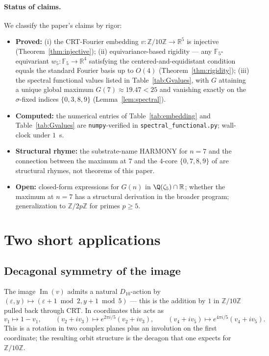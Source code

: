 \documentclass[11pt,reqno]{amsart}
\theoremstyle{definition}
\newcommand{\Z}{\mathbb{Z}}
\newcommand{\R}{\mathbb{R}}
\newcommand{\F}{\mathbb{F}}
\DeclareMathOperator{\Img}{Im}
\begin{document}
\paragraph{Status of claims.}
We classify the paper's claims by rigor:
\begin{itemize}\setlength\itemsep{2pt}
\item \textbf{Proved:} (i) the CRT-Fourier embedding
$v: \Z/10\Z \to \R^5$ is injective (Theorem~\ref{thm:injective});
(ii) equivariance-based rigidity --- any $\F_5$-equivariant
$w_5: \F_5 \to \R^4$ satisfying the centered-and-equidistant
condition equals the standard Fourier basis up to $O(4)$
(Theorem~\ref{thm:rigidity}); (iii) the spectral functional
values listed in Table~\ref{tab:Gvalues}, with $G$ attaining a
unique global maximum $G(7) \approx 19.47 < 25$ and vanishing
exactly on the $\sigma$-fixed indices $\{0, 3, 8, 9\}$
(Lemma~\ref{lem:spectral}).
\item \textbf{Computed:} the numerical entries of
Table~\ref{tab:embedding} and Table~\ref{tab:Gvalues} are
\texttt{numpy}-verified in
\texttt{spectral\_functional.py}; wall-clock under $1$~s.
\item \textbf{Structural rhyme:} the substrate-name HARMONY for
$n = 7$ and the connection between the maximum at $7$ and the
$4$-core $\{0, 7, 8, 9\}$ of \cite{SandersGishFourCore} are
structural rhymes, not theorems of this paper.
\item \textbf{Open:} closed-form expressions for $G(n)$ in
$\Q(\zeta_5) \cap \R$; whether the maximum at $n = 7$ has a
structural derivation in the broader program; generalization to
$\Z/2p\Z$ for primes $p \ge 5$.
\end{itemize}

\section{Two short applications}
\label{sec:applications}

\subsection{Decagonal symmetry of the image}

The image $\Img(v)$ admits a natural $D_{10}$-action by
$(\varepsilon, y) \mapsto (\varepsilon + 1 \bmod 2,
y + 1 \bmod 5)$ — this is the addition by $1$ in
$\Z/10\Z$ pulled back through CRT. In coordinates this acts as
\[
  v_1 \mapsto 1 - v_1,
  \qquad
  (v_2 + i v_3) \mapsto e^{2\pi i / 5}(v_2 + i v_3),
  \qquad
  (v_4 + i v_5) \mapsto e^{4\pi i / 5}(v_4 + i v_5).
\]
This is a rotation in two complex planes plus an involution on the
first coordinate; the resulting orbit structure is the decagon
that one expects for $\Z/10\Z$.
\end{document}
